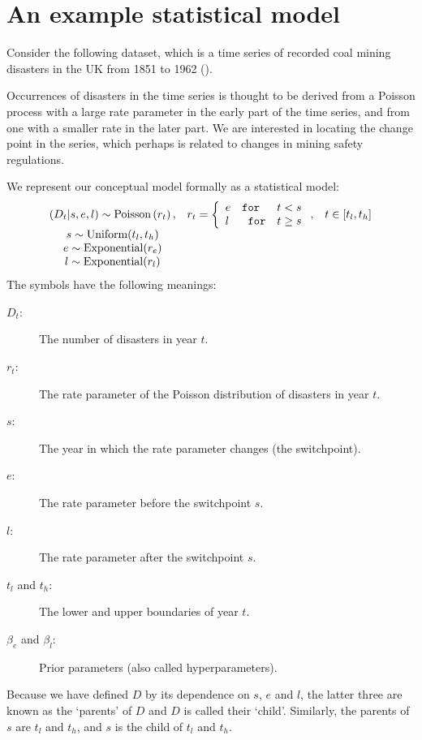 

\section*{An example statistical model}
Consider the following dataset, which is a time series of recorded coal mining disasters in the UK from 1851 to 1962 (\cite{Jarrett:1979fr}).
\begin{center}
\end{center}
Occurrences of disasters in the time series is thought to be derived from a Poisson process with a large rate parameter in the early part of the time series, and from one with a smaller rate in the later part. We are interested in locating the change point in the series, which perhaps is related to changes in mining safety regulations.

We represent our conceptual model formally as a statistical model:
\begin{equation}
    \begin{array}{ccc}
        (D_t | s, e, l) \sim \textup{Poisson}\left(r_t\right), & r_t=\left\{\begin{array}{lll}
            e &\texttt{for}& t< s\\ l &\texttt{ for}& t\ge s
            \end{array}\right.,&t\in[t_l,t_h]\\
        s\sim \textup{Uniform}(t_l, t_h)\\
        e\sim \textup{Exponential}(r_e)\\
        l\sim \textup{Exponential}(r_l)        
    \end{array}
    \label{disastermodel} 
\end{equation}
The symbols have the following meanings:
\begin{description}
    \item[$D_t$:] The number of disasters in year $t$.
    \item[$r_t$:] The rate parameter of the Poisson distribution of disasters in year $t$.
    \item[$s$:] The year in which the rate parameter changes (the switchpoint).
    \item[$e$:] The rate parameter before the switchpoint $s$.
    \item[$l$:] The rate parameter after the switchpoint $s$.
    \item[$t_l$ and $t_h$:] The lower and upper boundaries of year $t$.
    \item[$\beta_e$ and $\beta_l$:] Prior parameters (also called hyperparameters).
\end{description}
Because we have defined $D$ by its dependence on $s$, $e$ and $l$, the latter three are known as the `parents' of $D$ and $D$ is called their `child'. Similarly, the parents of $s$ are $t_l$ and $t_h$, and $s$ is the child of $t_l$ and $t_h$.

